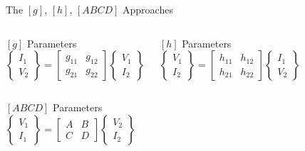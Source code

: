 \begin{frame}[allowframebreaks]{The $[g]$, $[h]$, $[ABCD]$ Approaches}
  
  \begin{columns}[T]
     \centering
    \begin{block}{$[g]$ Parameters}
      \begin{equation*}
        \begin{Bmatrix}  I_1 \\ V_2 \end{Bmatrix} =
        \begin{bmatrix}    g_{11} & g_{12} \\ g_{21}  & g_{22}  \end{bmatrix}
        \begin{Bmatrix}  V_1 \\ I_2  \end{Bmatrix} 
      \end{equation*}
    \end{block}
    
     \centering
    \begin{block}{$[h]$ Parameters}
      \begin{equation*}
        \begin{Bmatrix}  V_1 \\ I_2  \end{Bmatrix} =
        \begin{bmatrix}    h_{11} & h_{12} \\ h_{21}  & h_{22}  \end{bmatrix}
        \begin{Bmatrix}  I_1 \\ V_2 \end{Bmatrix} 
      \end{equation*}
    \end{block}
    
    \end{columns}

    \vbs
    
    \begin{columns}
     \centering
    \begin{block}{$[ABCD]$ Parameters}
      \begin{equation*}
        \begin{Bmatrix}  V_1 \\ I_1  \end{Bmatrix} =
        \begin{bmatrix}   A & B \\ C & D  \end{bmatrix}
        \begin{Bmatrix}  V_2 \\ I_2 \end{Bmatrix} 
      \end{equation*}
    \end{block}
  \end{columns}


\end{frame}
